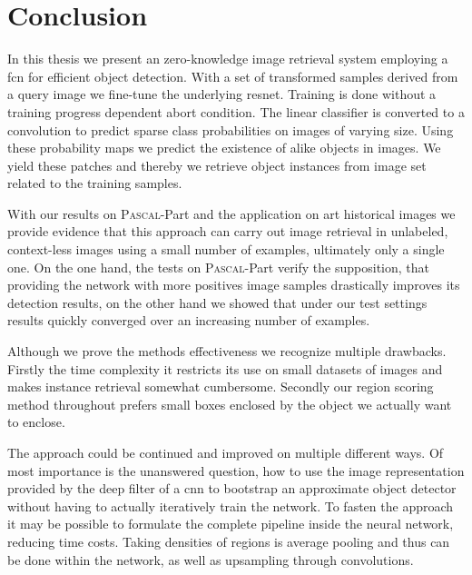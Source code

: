 %
\chapter{Conclusion}
\label{sec:conclusion}
In this thesis we present an zero-knowledge image retrieval system employing a \acrlong{fcn} for efficient object detection. With a set of transformed samples derived from a query image we fine-tune the underlying \gls{resnet}. Training is done without a training progress dependent abort condition. The linear classifier is converted to a convolution to predict sparse class probabilities on images of varying size. Using these probability maps we predict the existence of alike objects in images. We yield these patches and thereby we retrieve object instances from image set related to the training samples.

With our results on \textsc{Pascal}-Part and the application on art historical images we provide evidence that this approach can carry out image retrieval in unlabeled, context-less images using a small number of examples, ultimately only a single one. On the one hand, the tests on \textsc{Pascal}-Part verify the supposition, that providing the network with more positives image samples drastically improves its detection results, on the other hand we showed that under our test settings results quickly converged over an increasing number of examples.

Although we prove the methods effectiveness we recognize multiple drawbacks. Firstly the time complexity  it restricts its use on small datasets of images and makes instance retrieval somewhat cumbersome. Secondly our region scoring method throughout prefers small boxes enclosed by the object we actually want to enclose.

The approach could be continued and improved on multiple different ways. Of most importance is the unanswered question, how to use the image representation provided by the deep filter of a \gls{cnn} to bootstrap an approximate object detector without having to actually iteratively train the network. To fasten the approach it may be possible to formulate the complete pipeline inside the neural network, reducing time costs. Taking densities of regions is average pooling and thus can be done within the network, as well as upsampling through convolutions.
